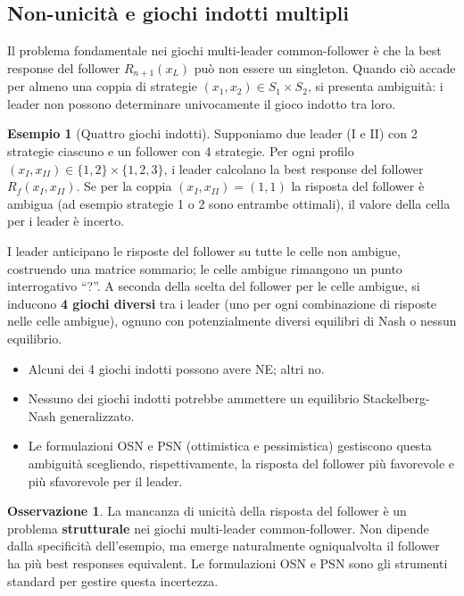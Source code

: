 \documentclass[12pt,a4paper,twoside]{book}
\theoremstyle{plain}
\theoremstyle{definition}
\newtheorem{example}[theorem]{Esempio}
\newtheorem{remark}[theorem]{Osservazione}
\begin{document}
\subsection{Non-unicità e giochi indotti multipli}

Il problema fondamentale nei giochi multi-leader common-follower è che la best response del follower $R_{n+1}(x_L)$ può non essere un singleton. Quando ciò accade per almeno una coppia di strategie $(x_1,x_2)\in S_1\times S_2$, si presenta ambiguità: i leader non possono determinare univocamente il gioco indotto tra loro.

\begin{example}[Quattro giochi indotti]
Supponiamo due leader (I e II) con 2 strategie ciascuno e un follower con 4 strategie. Per ogni profilo $(x_I,x_{II})\in\{1,2\}\times\{1,2,3\}$, i leader calcolano la best response del follower $R_f(x_I,x_{II})$. Se per la coppia $(x_I,x_{II})=(1,1)$ la risposta del follower è ambigua (ad esempio strategie 1 o 2 sono entrambe ottimali), il valore della cella per i leader è incerto.

I leader anticipano le risposte del follower su tutte le celle non ambigue, costruendo una matrice sommario; le celle ambigue rimangono un punto interrogativo ``?''. A seconda della scelta del follower per le celle ambigue, si inducono \textbf{4 giochi diversi} tra i leader (uno per ogni combinazione di risposte nelle celle ambigue), ognuno con potenzialmente diversi equilibri di Nash o nessun equilibrio.

\begin{itemize}
  \item Alcuni dei 4 giochi indotti possono avere NE; altri no.
  \item Nessuno dei giochi indotti potrebbe ammettere un equilibrio Stackelberg-Nash generalizzato.
  \item Le formulazioni OSN e PSN (ottimistica e pessimistica) gestiscono questa ambiguità scegliendo, rispettivamente, la risposta del follower più favorevole e più sfavorevole per il leader.
\end{itemize}
\end{example}

\begin{remark}
La mancanza di unicità della risposta del follower è un problema \textbf{strutturale} nei giochi multi-leader common-follower. Non dipende dalla specificità dell'esempio, ma emerge naturalmente ogniqualvolta il follower ha più best responses equivalent. Le formulazioni OSN e PSN sono gli strumenti standard per gestire questa incertezza.
\end{remark}
\end{document}
